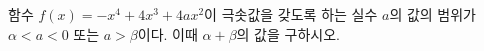 함수 $f(x)=-x^4+4x^3+4ax^2$이 극솟값을 갖도록 하는 실수 $a$의 값의 범위가 $\alpha<a<0$ 또는 $a>\beta$이다. 이때 $\alpha+\beta$의 값을 구하시오.
